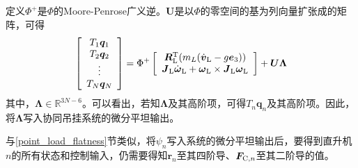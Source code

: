 定义$\Phi^{+}$是$\Phi$的Moore-Penrose广义逆。$\boldsymbol{U}$是以$\Phi$的零空间的基为列向量扩张成的矩阵，可得
\begin{equation}\label{T_each}
    \left[\begin{array}{c}
        T_1\boldsymbol{q}_1\\
        T_2\boldsymbol{q}_2\\
        \vdots\\
        T_N\boldsymbol{q}_N
    \end{array} 
    \right] = \Phi^{+}
        \left[\begin{array}{c}
            \boldsymbol{R}{\rm{_L^T}}(m_L(\dot{\boldsymbol{v}}{\rm{_L}}-g\boldsymbol{e}_3))\\
            \boldsymbol{J}{\rm{_L}}\dot{\boldsymbol{\omega}}{\rm{_L}} + \boldsymbol{\omega}{\rm{_L}} \times \boldsymbol{J}{\rm{_L}}\boldsymbol{\omega}{\rm{_L}}
        \end{array}
        \right]
     + \boldsymbol{U\Lambda}
\end{equation}
其中，$\boldsymbol{\Lambda} \in \mathbb{R}^{3N-6}$。可以看出，若知$\boldsymbol{\Lambda}$及其高阶项，可得$T_n\boldsymbol{q}_n$及其高阶项。因此，将$\boldsymbol{\Lambda}$写入协同吊挂系统的微分平坦输出。

与\ref{point_load_flatness}节类似，将$\psi_n$写入系统的微分平坦输出后，要得到直升机$n$的所有状态和控制输入，仍需要得知$\boldsymbol{r}_n$至其四阶导、$\boldsymbol{F}_{{\rm{C}},n}$至其二阶导的值。

